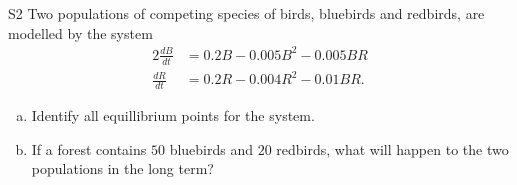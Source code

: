 \begin{problem}{S2}
Two populations of competing species of birds, bluebirds and redbirds, are modelled by the system
\begin{alignat*}{2}
\frac{dB}{dt} &= 0.2B - 0.005B^2 - 0.005BR \\
\frac{dR}{dt} & = 0.2R - 0.004R^2 - 0.01BR.
\end{alignat*}
\begin{enumerate}[(a)]
\item Identify all equillibrium points for the system.
\item If a forest contains \(50\) bluebirds and \(20\) redbirds, what will happen to the two populations in the long term?
\end{enumerate}
\end{problem}

